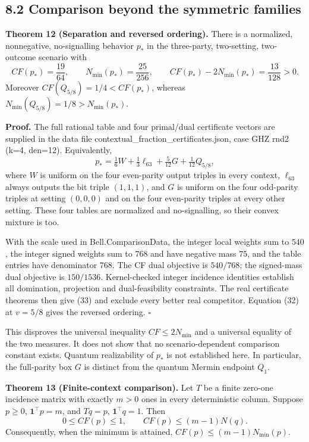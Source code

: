 \documentclass[
]{article}
\begin{document}
\subsection{8.2 Comparison beyond the symmetric families}\label{comparison-beyond-the-symmetric-families}

\textbf{Theorem 12 (Separation and reversed ordering).} There is a normalized, nonnegative, no-signalling behavior \(p_*\) in the three-party, two-setting, two-outcome scenario with
\[
CF(p_*)=\frac{19}{64},\qquad
N_{\min}(p_*)=\frac{25}{256},\qquad
CF(p_*)-2N_{\min}(p_*)=\frac{13}{128}>0.
\tag{33}
\]
Moreover \(CF(Q_{5/8})=1/4<CF(p_*)\), whereas \(N_{\min}(Q_{5/8})=1/8>N_{\min}(p_*)\).

\textbf{Proof.} The full rational table and four primal/dual certificate vectors are supplied in the data file contextual\_fraction\_certificates.json, case GHZ rnd2 (k=4, den=12). Equivalently,
\[
p_*=\tfrac16W+\tfrac13\ell_{63}+\tfrac5{12}G+\tfrac1{12}Q_{5/8},
\]
where \(W\) is uniform on the four even-parity output triples in every context, \(\ell_{63}\) always outputs the bit triple \((1,1,1)\), and \(G\) is uniform on the four odd-parity triples at setting \((0,0,0)\) and on the four even-parity triples at every other setting. These four tables are normalized and no-signalling, so their convex mixture is too.

With the scale used in Bell.ComparisonData, the integer local weights sum to \(540\), the integer signed weights sum to \(768\) and have negative mass \(75\), and the table entries have denominator \(768\). The CF dual objective is \(540/768\); the signed-mass dual objective is \(150/1536\). Kernel-checked integer incidence identities establish all domination, projection and dual-feasibility constraints. The real certificate theorems then give (33) and exclude every better real competitor. Equation (32) at \(v=5/8\) gives the reversed ordering. \(\square\)

This disproves the universal inequality \(CF\le2N_{\min}\) and a universal equality of the two measures. It does not show that no scenario-dependent comparison constant exists. Quantum realizability of \(p_*\) is not established here. In particular, the full-parity box \(G\) is distinct from the quantum Mermin endpoint \(Q_1\).

\textbf{Theorem 13 (Finite-context comparison).} Let \(T\) be a finite zero-one incidence matrix with exactly \(m>0\) ones in every deterministic column. Suppose \(p\ge0\), \(\mathbf1^\top p=m\), and \(Tq=p\), \(\mathbf1^\top q=1\). Then
\[
0\le CF(p)\le1,\qquad CF(p)\le(m-1)N(q).
\tag{34}
\]
Consequently, when the minimum is attained, \(CF(p)\le(m-1)N_{\min}(p)\).
\end{document}
